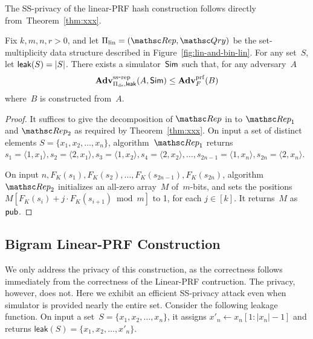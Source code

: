 The SS-privacy of the linear-PRF hash construction follows directly from~Theorem~\ref{thm:xxx}.
\begin{theorem}\label{thm:lin-privacy}
Fix $k,m,n,r>0$, and let $\Pi_{\mathrm{lin}}= (\Rep, \Qry)$ be the set-multiplicity data structure described in Figure~\ref{fig:lin-and-bin-lin}. For any set~$S$, let ${\sf leak}(S)=|S|$.  There exists a simulator~${\sf Sim}$ such that, for any adversary~$A$
\[
\mathrm{\mathbf{Adv}}^{\mathrm{ss\mbox{-}rep}}_{\Pi_{\mathrm{ds}},{\sf leak}}(A,{\sf Sim}) \leq  \mathbf{Adv}^{\mathrm{prf}}_{F}(B)
\]
where~$B$ is constructed from~$A$.  
\end{theorem}
\begin{proof}
It suffices to give the decomposition of $\Rep$ in to $\Rep_1$ and $\Rep_2$ as required by Theorem~\ref{thm:xxx}.
On input a set of distinct elements
$S=\{x_1,x_2,\ldots,x_n\}$, algorithm~$\Rep_1$ returns $s_1=\langle 1,x_1 \rangle, s_2=\langle 2,x_1 \rangle, s_3 = \langle 1,x_2\rangle, s_4=\langle 2,x_2 \rangle,\ldots,s_{2n-1}=\langle 1,x_n \rangle, s_{2n}=\langle 2,x_n \rangle$.

On input $n,F_K(s_1),F_K(s_2),\ldots,F_K(s_{2n-1}) , F_K(s_{2n})$, algorithm $\Rep_2$ initializes an all-zero array~$M$ of~$m$-bits, and sets the positions $M[F_K(s_i)+j\cdot F_K(s_{i+1})\bmod m]$ to 1, for each $j \in [k]$.  It returns~$M$ as ${\sf pub}$.
\end{proof}


\subsection{Bigram Linear-PRF Construction}
We only address the privacy of this construction, as the correctness follows immediately from the correctness of the Linear-PRF contruction.  The privacy, however, does not.  Here we exhibit an efficient SS-privacy attack even when simulator is provided nearly the entire set.  Consider the following leakage function.  On input a set~$S=\{x_1,x_2,\ldots,x_n\}$, it assigns $x'_n \gets x_n[1:|x_n|-1]$ and returns $\mathsf{leak}(S)=\{x_1,x_2,\ldots,x'_n\}$.  

